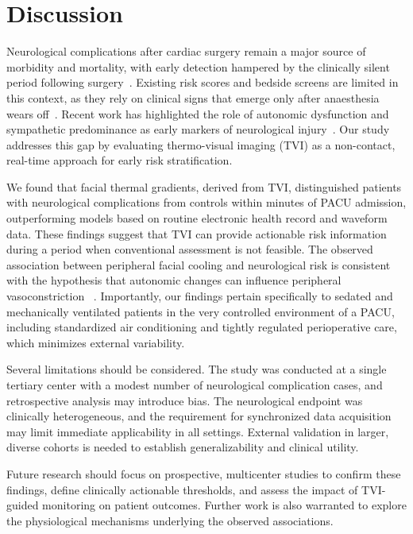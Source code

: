 \documentclass[11pt]{article}
\begin{document}
\section*{Discussion}

Neurological complications after cardiac surgery remain a major source of morbidity and mortality, with early detection hampered by the clinically silent period following surgery~\citep{arrowsmith2000central, salazar2001stroke, liu2022recent, amundson2020timing}. Existing risk scores and bedside screens are limited in this context, as they rely on clinical signs that emerge only after anaesthesia wears off~\citep{euroscore2, sts2018, ely2001camicu, nudesc}. Recent work has highlighted the role of autonomic dysfunction and sympathetic predominance as early markers of neurological injury~\citep{wehrwein2016overview, jimenez2021cardiovascular, sposato2020post, de2015autonomic, mankoo2023role, mattimore2023delirium}. Our study addresses this gap by evaluating thermo-visual imaging (TVI) as a non-contact, real-time approach for early risk stratification.

We found that facial thermal gradients, derived from TVI, distinguished patients with neurological complications from controls within minutes of PACU admission, outperforming models based on routine electronic health record and waveform data. These findings suggest that TVI can provide actionable risk information during a period when conventional assessment is not feasible. The observed association between peripheral facial cooling and neurological risk is consistent with the hypothesis that autonomic changes can influence peripheral vasoconstriction ~\citep{wehrwein2016overview, sheng2018crosstalk, jorge_non-contact_2021}. Importantly, our findings pertain specifically to sedated and mechanically ventilated patients in the very controlled environment of a PACU, including standardized air conditioning and tightly regulated perioperative care, which minimizes external variability.

Several limitations should be considered. The study was conducted at a single tertiary center with a modest number of neurological complication cases, and retrospective analysis may introduce bias. The neurological endpoint was clinically heterogeneous, and the requirement for synchronized data acquisition may limit immediate applicability in all settings. External validation in larger, diverse cohorts is needed to establish generalizability and clinical utility.

Future research should focus on prospective, multicenter studies to confirm these findings, define clinically actionable thresholds, and assess the impact of TVI-guided monitoring on patient outcomes. Further work is also warranted to explore the physiological mechanisms underlying the observed associations.
\end{document}

